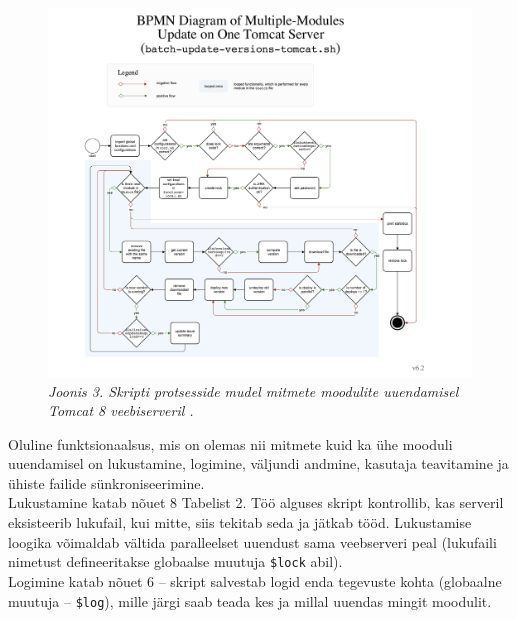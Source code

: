 \documentclass[12pt]{report}
\newcommand{\code}[1]{\texttt{#1}}
\begin{document}
   \begin{figure}[H]
     \begin{center}
       \includegraphics[width=\textwidth]{diagrams/BPMN-diagram-multiple-module-update-tomcat.png}
       \caption*{\textit{Joonis 3. Skripti protsesside mudel mitmete moodulite uuendamisel Tomcat 8 veebiserveril \footnotemark.}}
     \end{center}
   \end{figure}
   
   
   \newpage
   
   Oluline funktsionaalsus, mis on olemas nii mitmete kuid ka ühe mooduli uuendamisel on lukustamine, logimine, väljundi andmine, kasutaja teavitamine ja ühiste failide sünkroniseerimine.\\
   
   Lukustamine katab nõuet 8 Tabelist 2. Töö alguses skript kontrollib, kas serveril eksisteerib lukufail, kui mitte, siis tekitab seda ja jätkab tööd. Lukustamise loogika võimaldab vältida paralleelset uuendust sama veebserveri peal (lukufaili nimetust defineeritakse globaalse muutuja \code{\$lock} abil).\\
   
   Logimine katab nõuet 6 \--- skript salvestab logid enda tegevuste kohta (globaalne muutuja \--- \code{\$log}), mille järgi saab teada kes ja millal uuendas mingit moodulit.\\
   
\end{document}

